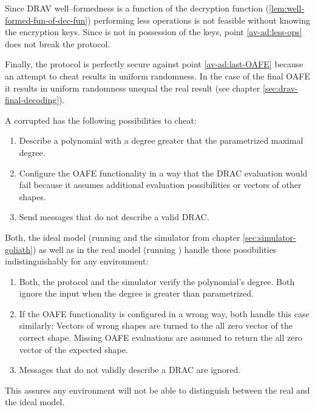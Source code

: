 Since DRAV well--formedness is a function of the decryption function
(\ref{lem:well-formed-fun-of-dec-fun}) performing less operations is not
feasible without knowing the encryption keys. Since \JWpTwo{} is not in
possession of the keys, point \ref{av-ad:less-ops} does not break the protocol.

Finally, the protocol is perfectly secure against point \ref{av-ad:last-OAFE}
because an attempt to cheat results in uniform randomness. In the case of
the final OAFE it results in uniform randomness unequal the real result (see
chapter \ref{sec:drav-final-decoding}).



A corrupted \JWpOne{} has the following possibilities to cheat:

\begin{enumerate}

  \item Describe a polynomial with a degree greater that the parametrized
    maximal degree.

  \item Configure the OAFE functionality in a way that the DRAC evaluation would
    fail because it assumes additional evaluation possibilities or vectors of
    other shapes.

  \item Send messages that do not describe a valid DRAC.

\end{enumerate}

Both, the ideal model (running \JWfuncSymOPE{} and the simulator from chapter
\ref{sec:simulator-goliath}) as well as in the real model (running
\JWprotoSymOPE{}) handle these possibilities indistinguishably for any
environment:

\begin{enumerate}

  \item Both, the protocol and the simulator verify the polynomial's degree.
    Both ignore the input when the degree is greater than parametrized.

  \item If the OAFE functionality is configured in a wrong way, both handle this
    case similarly: Vectors of wrong shapes are turned to the all zero vector of
    the correct shape. Missing OAFE evaluations are assumed to return the all
    zero vector of the expected shape.

  \item Messages that do not validly describe a DRAC are ignored.

\end{enumerate}

This assures any environment will not be able to distinguish between the real
and the ideal model.

